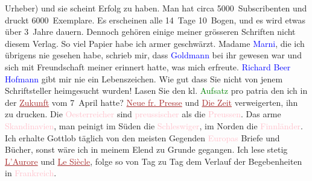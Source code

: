                     Urheber) und sie scheint Erfolg zu haben. Man hat circa 5000 Subscribenten und
                    druckt 6000 Exemplare. Es erscheinen alle 14 Tage 10 Bogen, und es wird etwas
                    über 3 Jahre dauern. Dennoch gehören einige meiner grösseren Schriften nicht
                    diesem Verlag. So viel Papier habe ich armer geschwärzt.\pend
           \pstart
           Madame \textcolor{blue}{Marni}{}\ledrightnote{\textcolor{blue}{Jeanne Marni}}, die ich übrigens nie gesehen
                    habe, schrieb mir, dass \textcolor{blue}{Goldmann}{}\ledrightnote{\textcolor{blue}{Paul Goldmann}} bei ihr
                    gewesen war und sich mit Freundschaft meiner erinnert hatte, was mich erfreute.
                        \textcolor{blue}{Richard Beer Hofmann}{}\ledrightnote{\textcolor{blue}{Richard Beer-Hofmann}} gibt mir nie {\pb}ein Lebenszeichen.\pend
           \pstart
           Wie gut dass Sie nicht von jenem Schriftsteller heimgesucht wurden! Lasen Sie den
                    kl. \textcolor{green}{Aufsatz}{} pro patria den
                    ich in der \textcolor{brown}{\uline{Zukunft}}{}\ledrightnote{\textcolor{brown}{Die Zukunft}} vom 7 April hatte?
                        \textcolor{brown}{\uline{Neue fr. Presse}}{}\ledrightnote{\textcolor{brown}{Neue Freie Presse}} und \textcolor{brown}{\uline{Die Zeit}}{}\ledrightnote{\textcolor{brown}{Die Zeit. Wiener Wochenschrift}} verweigerten, ihn zu drucken.
                    Die \textcolor{pink}{Oesterreicher}{}\ledrightnote{\textcolor{pink}{Österreich}}
               sind \textcolor{pink}{preussischer}{}\ledrightnote{\textcolor{pink}{Preußen}} als die \textcolor{pink}{Preussen}{}\ledrightnote{\textcolor{pink}{Preußen}}. Das arme \textcolor{pink}{Skandinavien}{}\ledrightnote{\textcolor{pink}{Skandinavien}}, man peinigt im Süden die \textcolor{pink}{Schleswiger}{}\ledrightnote{\textcolor{pink}{Südschleswig}}, im Norden die \textcolor{pink}{Finnländer}{}\ledrightnote{\textcolor{pink}{Finnland}}.\pend
           \pstart
           Ich erhalte Gottlob täglich von den meisten Gegenden \textcolor{pink}{Europas}{}\ledrightnote{\textcolor{pink}{Europa}} Briefe und Bücher, sonst wäre ich in meinem Elend zu Grunde
                    gegangen. Ich lese stetig \textcolor{brown}{\uline{L’Aurore}}{}\ledrightnote{\textcolor{brown}{L’Aurore}} und \textcolor{brown}{\uline{Le Siècle}}{}\ledrightnote{\textcolor{brown}{Le Siècle}}, folge so von Tag zu Tag dem
                    Verlauf der Begebenheiten in \textcolor{pink}{Frankreich}{}\ledrightnote{\textcolor{pink}{Frankreich}}.
